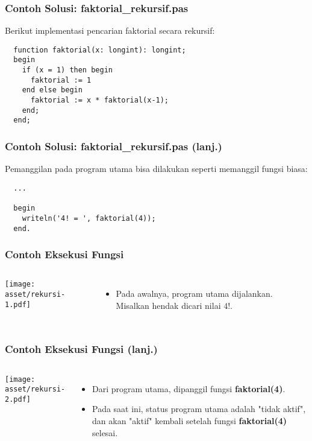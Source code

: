 \begin{frame}[fragile]
\frametitle{Contoh Solusi: faktorial\_rekursif.pas}
Berikut implementasi pencarian faktorial secara rekursif:
\begin{lstlisting}
  function faktorial(x: longint): longint;
  begin
    if (x = 1) then begin
      faktorial := 1
    end else begin
      faktorial := x * faktorial(x-1); 
    end;
  end;
\end{lstlisting}
\end{frame}

\begin{frame}[fragile]
\frametitle{Contoh Solusi: faktorial\_rekursif.pas (lanj.)}
Pemanggilan pada program utama bisa dilakukan seperti memanggil fungsi biasa:
\begin{lstlisting}
  ...
  
  begin
    writeln('4! = ', faktorial(4));
  end.
\end{lstlisting}
\end{frame}

\begin{frame}
\frametitle{Contoh Eksekusi Fungsi}
\begin{columns}
    \centering
    \texttt{[image: asset/rekursi-1.pdf]}
    \begin{itemize}
      \item Pada awalnya, program utama dijalankan. Misalkan hendak dicari nilai $4!$.
    \end{itemize} 
  \end{columns} 
\end{frame}

\begin{frame}
\frametitle{Contoh Eksekusi Fungsi (lanj.)}
\begin{columns}
    \centering
    \texttt{[image: asset/rekursi-2.pdf]}
    \begin{itemize}
      \item Dari program utama, dipanggil fungsi \textbf{faktorial(4)}.
      \item Pada saat ini, status program utama adalah "tidak aktif", dan akan "aktif" kembali setelah fungsi \textbf{faktorial(4)} selesai.
    \end{itemize}
  \end{columns} 
\end{frame}

